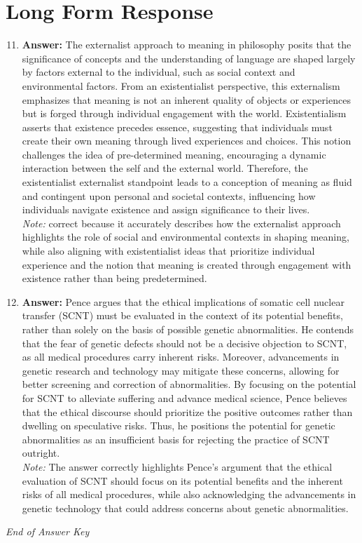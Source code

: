 \documentclass[12pt]{article}
\begin{document}
\section*{Long Form Response}
\begin{enumerate}[label=\arabic*.]
\setcounter{enumi}{10}
\item \textbf{Answer:} The externalist approach to meaning in philosophy posits that the significance of concepts and the understanding of language are shaped largely by factors external to the individual, such as social context and environmental factors. From an existentialist perspective, this externalism emphasizes that meaning is not an inherent quality of objects or experiences but is forged through individual engagement with the world. Existentialism asserts that existence precedes essence, suggesting that individuals must create their own meaning through lived experiences and choices. This notion challenges the idea of pre-determined meaning, encouraging a dynamic interaction between the self and the external world. Therefore, the existentialist externalist standpoint leads to a conception of meaning as fluid and contingent upon personal and societal contexts, influencing how individuals navigate existence and assign significance to their lives.
\\ \textit{Note:} correct because it accurately describes how the externalist approach highlights the role of social and environmental contexts in shaping meaning, while also aligning with existentialist ideas that prioritize individual experience and the notion that meaning is created through engagement with existence rather than being predetermined.
\item \textbf{Answer:} Pence argues that the ethical implications of somatic cell nuclear transfer (SCNT) must be evaluated in the context of its potential benefits, rather than solely on the basis of possible genetic abnormalities. He contends that the fear of genetic defects should not be a decisive objection to SCNT, as all medical procedures carry inherent risks. Moreover, advancements in genetic research and technology may mitigate these concerns, allowing for better screening and correction of abnormalities. By focusing on the potential for SCNT to alleviate suffering and advance medical science, Pence believes that the ethical discourse should prioritize the positive outcomes rather than dwelling on speculative risks. Thus, he positions the potential for genetic abnormalities as an insufficient basis for rejecting the practice of SCNT outright.
\\ \textit{Note:} The answer correctly highlights Pence's argument that the ethical evaluation of SCNT should focus on its potential benefits and the inherent risks of all medical procedures, while also acknowledging the advancements in genetic technology that could address concerns about genetic abnormalities.
\end{enumerate}

\vfill
\noindent\textit{End of Answer Key}
\end{document}

